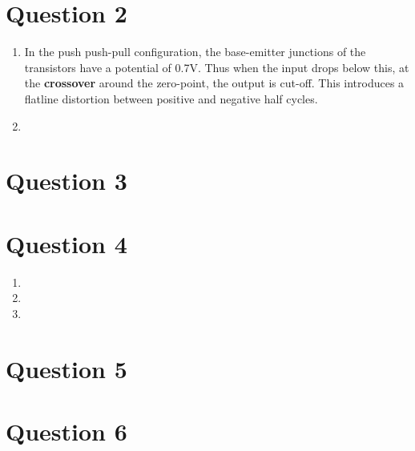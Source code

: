 \documentclass[11pt]{article}
\begin{document}
\section*{Question 2}
  \begin{enumerate}[label=\alph*)]
    \item %
    In the push push-pull configuration, the base-emitter junctions of the transistors have a potential of 0.7V. Thus when the input drops below this, at the \textbf{crossover} around the zero-point, the output is cut-off. This introduces a flatline distortion between positive and negative half cycles.

    \item %
    

  \end{enumerate}

\section*{Question 3}

\section*{Question 4}
  \begin{enumerate}[label=\roman*)]
    \item %
    \item %
    \item %
  \end{enumerate}

\section*{Question 5}

\section*{Question 6}
\end{document}
